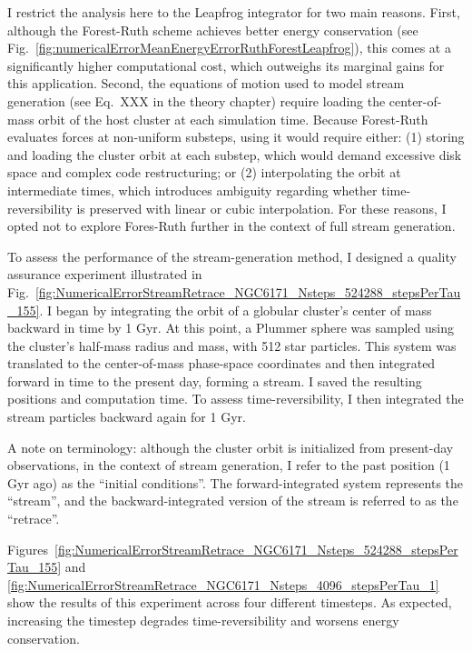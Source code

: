         I restrict the analysis here to the Leapfrog integrator for two main reasons. First, although the Forest-Ruth scheme achieves better energy conservation (see Fig.~\ref{fig:numericalErrorMeanEnergyErrorRuthForestLeapfrog}), this comes at a significantly higher computational cost, which outweighs its marginal gains for this application. Second, the equations of motion used to model stream generation (see Eq.~XXX in the theory chapter) require loading the center-of-mass orbit of the host cluster at each simulation time. Because Forest-Ruth evaluates forces at non-uniform substeps, using it would require either: (1) storing and loading the cluster orbit at each substep, which would demand excessive disk space and complex code restructuring; or (2) interpolating the orbit at intermediate times, which introduces ambiguity regarding whether time-reversibility is preserved with linear or cubic interpolation. For these reasons, I opted not to explore Fores-Ruth further in the context of full stream generation.

        To assess the performance of the stream-generation method, I designed a quality assurance experiment illustrated in Fig.~\ref{fig:NumericalErrorStreamRetrace_NGC6171_Nsteps_524288_stepsPerTau_155}. I began by integrating the orbit of a globular cluster's center of mass backward in time by 1 Gyr. At this point, a Plummer sphere was sampled using the cluster's half-mass radius and mass, with 512 star particles. This system was translated to the center-of-mass phase-space coordinates and then integrated forward in time to the present day, forming a stream. I saved the resulting positions and computation time. To assess time-reversibility, I then integrated the stream particles backward again for 1 Gyr.

        A note on terminology: although the cluster orbit is initialized from present-day observations, in the context of stream generation, I refer to the past position (1 Gyr ago) as the ``initial conditions''. The forward-integrated system represents the ``stream'', and the backward-integrated version of the stream is referred to as the ``retrace''.

        Figures~\ref{fig:NumericalErrorStreamRetrace_NGC6171_Nsteps_524288_stepsPerTau_155} and \ref{fig:NumericalErrorStreamRetrace_NGC6171_Nsteps_4096_stepsPerTau_1} show the results of this experiment across four different timesteps. As expected, increasing the timestep degrades time-reversibility and worsens energy conservation.

